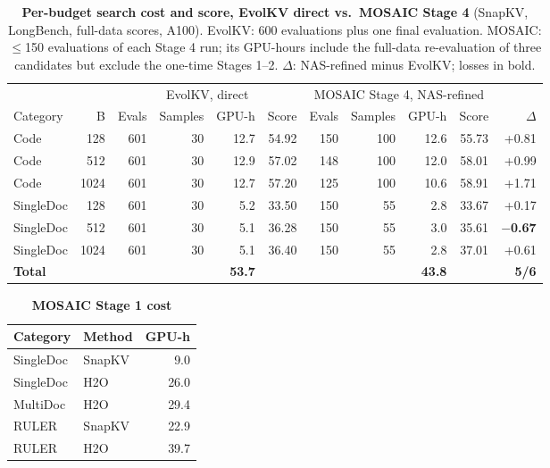 \begin{table}[t]
  \centering
  \footnotesize
  \setlength{\tabcolsep}{4pt}
  \begin{tabular}{@{}l r r r r r r r r r r@{}}
    \toprule
    & & \multicolumn{4}{c}{EvolKV, direct} & \multicolumn{4}{c}{MOSAIC Stage 4, NAS-refined} & \\ \cmidrule(lr){3-6}\cmidrule(lr){7-10}
    Category & B & Evals & Samples & GPU-h & Score & Evals & Samples & GPU-h & Score & $\Delta$ \\
    \midrule
    Code & 128 & 601 & 30 & 12.7 & 54.92 & 150 & 100 & 12.6 & 55.73 & +0.81 \\
    Code & 512 & 601 & 30 & 12.9 & 57.02 & 148 & 100 & 12.0 & 58.01 & +0.99 \\
    Code & 1024 & 601 & 30 & 12.7 & 57.20 & 125 & 100 & 10.6 & 58.91 & +1.71 \\
    SingleDoc & 128 & 601 & 30 & 5.2 & 33.50 & 150 & 55 & 2.8 & 33.67 & +0.17 \\
    SingleDoc & 512 & 601 & 30 & 5.1 & 36.28 & 150 & 55 & 3.0 & 35.61 & \textbf{$-$0.67} \\
    SingleDoc & 1024 & 601 & 30 & 5.1 & 36.40 & 150 & 55 & 2.8 & 37.01 & +0.61 \\
    \textbf{Total} &  &  &  & \textbf{53.7} &  &  &  & \textbf{43.8} &  & \textbf{5/6} \\
    \bottomrule
  \end{tabular}
  \caption{\textbf{Per-budget search cost and score, EvolKV direct vs.\ MOSAIC Stage 4} (SnapKV, LongBench, full-data scores, A100). EvolKV: 600 evaluations plus one final evaluation. MOSAIC: $\leq$150 evaluations of each Stage 4 run; its GPU-hours include the full-data re-evaluation of three candidates but exclude the one-time Stages 1--2. $\Delta$: NAS-refined minus EvolKV; losses in bold.}
  \label{tab:app-cost}
\end{table}

\begin{table}[t]
  \centering
  \footnotesize
  \setlength{\tabcolsep}{4pt}
  \begin{tabular}{@{}l l r@{}}
    \toprule
    Category & Method & GPU-h \\
    \midrule
    SingleDoc & SnapKV & 9.0 \\
    SingleDoc & H2O & 26.0 \\
    MultiDoc & H2O & 29.4 \\
    RULER & SnapKV & 22.9 \\
    RULER & H2O & 39.7 \\
    \bottomrule
  \end{tabular}
  \caption{\textbf{MOSAIC Stage 1 cost}}
  \label{tab:app-step1}
\end{table}


